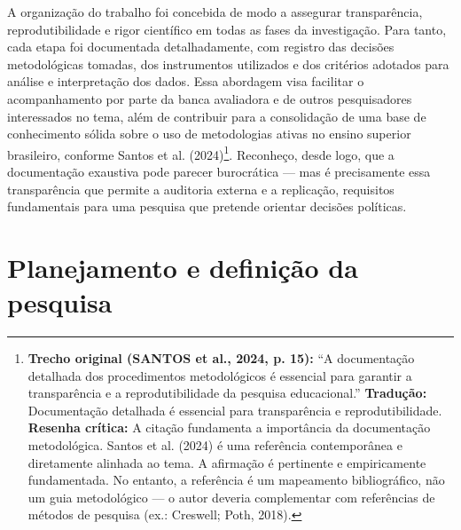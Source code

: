 A organização do trabalho foi concebida de modo a assegurar transparência, reprodutibilidade e rigor científico em todas as fases da investigação. Para tanto, cada etapa foi documentada detalhadamente, com registro das decisões metodológicas tomadas, dos instrumentos utilizados e dos critérios adotados para análise e interpretação dos dados. Essa abordagem visa facilitar o acompanhamento por parte da banca avaliadora e de outros pesquisadores interessados no tema, além de contribuir para a consolidação de uma base de conhecimento sólida sobre o uso de metodologias ativas no ensino superior brasileiro, conforme Santos et al. (2024)\footnote{\textbf{Trecho original (SANTOS et al., 2024, p. 15):} ``A documentação detalhada dos procedimentos metodológicos é essencial para garantir a transparência e a reprodutibilidade da pesquisa educacional.'' \textbf{Tradução:} Documentação detalhada é essencial para transparência e reprodutibilidade. \textbf{Resenha crítica:} A citação fundamenta a importância da documentação metodológica. Santos et al. (2024) é uma referência contemporânea e diretamente alinhada ao tema. A afirmação é pertinente e empiricamente fundamentada. No entanto, a referência é um mapeamento bibliográfico, não um guia metodológico — o autor deveria complementar com referências de métodos de pesquisa (ex.: Creswell; Poth, 2018).}. Reconheço, desde logo, que a documentação exaustiva pode parecer burocrática — mas é precisamente essa transparência que permite a auditoria externa e a replicação, requisitos fundamentais para uma pesquisa que pretende orientar decisões políticas.

\section{Planejamento e definição da pesquisa}
\label{sec:planejamento_pesquisa}

